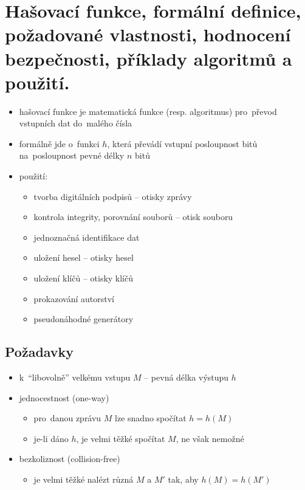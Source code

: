 \clearpage
\section{Hašovací funkce, formální definice, požadované vlastnosti, hodnocení bezpečnosti, příklady algoritmů a použití.}

\begin{itemize}
    \item hašovací funkce je matematická funkce (resp. algoritmus) pro~převod vstupních dat do~malého čísla
    \item formálně jde o~funkci $h$, která převádí vstupní posloupnost bitů na~posloupnost pevné délky $n$ bitů
    \item použití:
    \begin{itemize}
        \item tvorba digitálních podpisů -- otisky zprávy
        \item kontrola integrity, porovnání souborů -- otisk souboru
        \item jednoznačná identifikace dat
        \item uložení hesel -- otisky hesel
        \item uložení klíčů -- otisky klíčů
        \item prokazování autorství
        \item pseudonáhodné generátory
    \end{itemize}
\end{itemize}

\subsection{Požadavky}
\begin{itemize}
    \item k~\enquote{libovolně} velkému vstupu $M$ -- pevná délka výstupu $h$
    \item jednocestnost (one-way)
    \begin{itemize}
        \item pro~danou zprávu $M$ lze snadno spočítat $h = h(M)$
        \item je-li dáno $h$, je velmi těžké spočítat $M$, ne však nemožné
    \end{itemize}
    \item bezkoliznost (collision-free)
    \begin{itemize}
        \item je velmi těžké nalézt různá $M$ a $M'$ tak, aby $h(M) = h(M')$
    \end{itemize}
\end{itemize}

